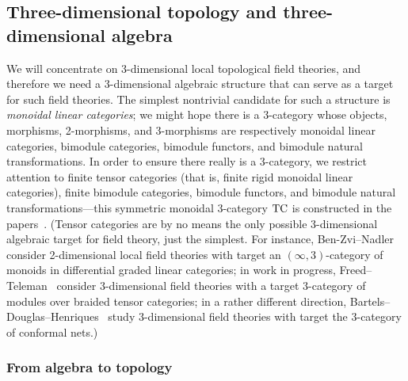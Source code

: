 \documentclass{amsart}
\begin{document}
\subsection{Three-dimensional topology and three-dimensional algebra}

We will concentrate on 3-dimensional local topological field theories, and therefore we need a 3-dimensional algebraic structure that can serve as a target for such field theories.  The simplest nontrivial candidate for such a structure is \emph{monoidal linear categories}; we might hope there is a 3-category whose objects, morphisms, 2-morphisms, and 3-morphisms are respectively monoidal linear categories, bimodule categories, bimodule functors, and bimodule natural transformations.  In order to ensure there really is a 3-category, we restrict attention to finite tensor categories (that is, finite rigid monoidal linear categories), finite bimodule categories, bimodule functors, and bimodule natural transformations---this symmetric monoidal 3-category $\mathrm{TC}$ is constructed in the papers~\cite{BTP,3TC}.  (Tensor categories are by no means the only possible 3-dimensional algebraic target for field theory, just the simplest.  For instance, Ben-Zvi--Nadler~\cite{0904.1247} consider 2-dimensional local field theories with target an $(\infty,3)$-category of monoids in differential graded linear categories; in work in progress, Freed--Teleman~\cite{FT} consider 3-dimensional field theories with a target 3-category of modules over braided tensor categories; in a rather different direction, Bartels--Douglas--Henriques~\cite{bdh} study 3-dimensional field theories with target the 3-category of conformal nets.)


\subsubsection{From algebra to topology}
\end{document}
